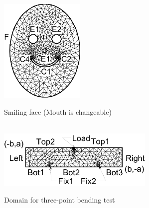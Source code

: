 \documentclass[a4paper,twoside,12pt]{book}
\begin{document}
\begin{figure}[hbt]
\begin{multicols}{2}
\begin{center}
\includegraphics*[height=5cm]{SmileFace}
\caption{\label{SmileFace} Smiling face (Mouth is changeable)}
\end{center}
\begin{center}
\vspace{2cm}~~\\
\includegraphics*[height=2.8cm]{ThreePoint}
\caption{\label{ThreePoint} Domain for three-point bending test}
\end{center}
\end{multicols}
\end{figure}

\end{document}

